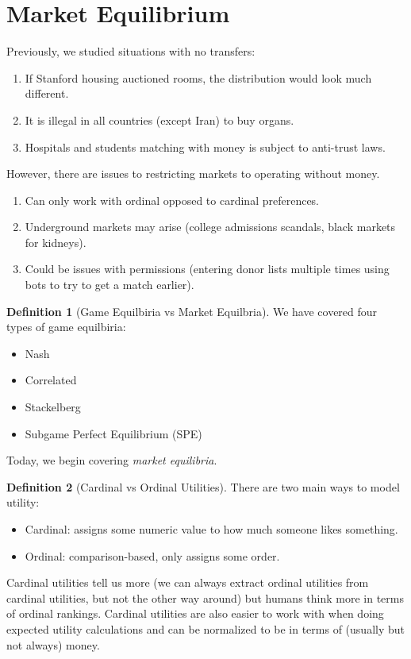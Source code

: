 \documentclass[dvipsnames]{article}
\theoremstyle{definition}
\newtheorem{definition}{Definition}[section]
\theoremstyle{remark}
\begin{document}
\newpage

\section{Market Equilibrium}

Previously, we studied situations with no transfers:
\begin{enumerate}
	\item If Stanford housing auctioned rooms, the distribution would look much different.
	\item It is illegal in all countries (except Iran) to buy organs.
	\item Hospitals and students matching with money is subject to anti-trust laws.
\end{enumerate}
However, there are issues to restricting markets to operating without money.
\begin{enumerate}
	\item Can only work with ordinal opposed to cardinal preferences.
	\item Underground markets may arise (college admissions scandals, black markets for kidneys).
	\item Could be issues with permissions (entering donor lists multiple times using bots to try to get a match earlier).
\end{enumerate}

\begin{definition}[Game Equilbiria vs Market Equilbria]
	We have covered four types of game equilbiria:
	\begin{itemize}
		\item Nash
		\item Correlated
		\item Stackelberg
		\item Subgame Perfect Equilibrium (SPE)
	\end{itemize}
	Today, we begin covering \textit{market equilibria}.
\end{definition}

\begin{definition}[Cardinal vs Ordinal Utilities]
	There are two main ways to model utility:
	\begin{itemize}
		\item Cardinal: assigns some numeric value to how much someone likes something.
		\item Ordinal: comparison-based, only assigns some order.
	\end{itemize}
	Cardinal utilities tell us more (we can always extract ordinal utilities from cardinal utilities, but not the other way around) but humans think more in terms of ordinal rankings. Cardinal utilities are also easier to work with when doing expected utility calculations and can be normalized to be in terms of (usually but not always) money.
\end{definition}
\end{document}
